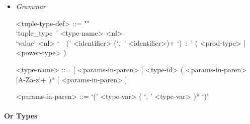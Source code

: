 \documentclass{article}
\begin{document}
\begin{itemize}
\item \textit{Grammar}

\begin{grammar}
<tuple-type-def> ::= ""\\
`tuple_type\ ' <type-name> <nl> \\
`value' <nl> `\ \ (' <identifier> (`,\ ' <identifier>)+ `)\ :\ '
( <prod-type> | <power-type> )

<type-name> ::= 
[ <params-in-paren> ] <type-id> ( <params-in-paren> [A-Za-z]+ )*
[ <params-in-paren> ]

<params-in-paren> ::= `(' <type-var> ( `, ' <type-var> )* `)'
\end{grammar}

\end{itemize}

\paragraph{Or Types}
\end{document}
